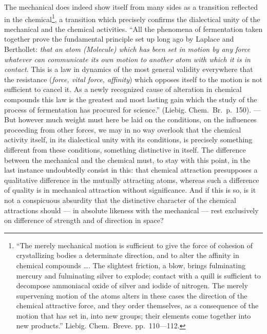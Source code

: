 \documentclass[12pt,a4paper]{book}
\begin{document}
The mechanical does indeed show itself from many sides as a transition
reflected in the chemical\footnote{``The merely mechanical motion is sufficient
to give the force of cohesion of crystallizing bodies a determinate direction,
and to alter the affinity in chemical compounds \ldots. The slightest friction,
a blow, brings fulminating mercury and fulminating silver to explode; contact
with a quill is sufficient to decompose ammoniacal oxide of silver and iodide
of nitrogen. The merely supervening motion of the atoms alters in these cases
the direction of the chemical attractive force, and they order themselves, as a
consequence of the motion that has set in, into new groups; their elements come
together into new products.'' Liebig. Chem.\ Breve. pp.~110---112.}, a
transition which precisely
confirms the dialectical unity of the mechanical and the chemical activities.
``All the phenomena of fermentation taken together prove the fundamental
principle set up long ago by Laplace and Berthollet: \emph{that an atom
(\textit{Molecule}) which has been set in motion by any force whatever can
communicate its own motion to another atom with which it is in contact}. This
is a law in dynamics of the most general validity everywhere that the
resistance (\emph{force, vital force, affinity}) which opposes itself to the
motion is not sufficient to cancel it. As a newly recognized cause of
alteration in chemical compounds this law is the greatest and most lasting gain
which the study of the process of fermentation has procured for science.''
(Liebig. Chem.\ Br.\ p.~150). --- But however much weight must here be laid on
the conditions, on the influences proceeding from other forces, we may in no
way overlook that the chemical activity itself, in its dialectical unity with
its conditions, is precisely something different from these conditions,
something distinctive in itself. The difference between the mechanical and the
chemical must, to stay with this point, in the last instance undoubtedly
consist in this: that chemical attraction presupposes a qualitative difference
in the mutually attracting atoms, whereas such a difference of quality is in
mechanical attraction without significance. And if this is so, is it not a
conspicuous absurdity that the distinctive character of the chemical
attractions should --- in absolute likeness with the mechanical --- rest
exclusively on difference of strength and of direction in space?
\end{document}
